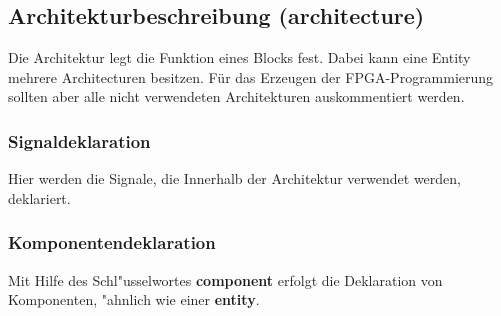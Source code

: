 	
	\subsection{Architekturbeschreibung (architecture)}
		Die Architektur legt die Funktion eines Blocks fest. Dabei kann eine Entity mehrere 				Architecturen besitzen. Für das Erzeugen der FPGA-Programmierung sollten aber alle 
		nicht verwendeten Architekturen auskommentiert werden.
		

\begin{multicols}{2}
		\subsubsection{Signaldeklaration}
			 Hier werden die Signale, die Innerhalb der Architektur verwendet werden, 
			deklariert.
				
			
		\subsubsection{Komponentendeklaration}
			Mit Hilfe des Schl"usselwortes \textbf{component} erfolgt die Deklaration von 
			Komponenten, "ahnlich wie einer \textbf{entity}.\\
			
		
\end{multicols}
	
